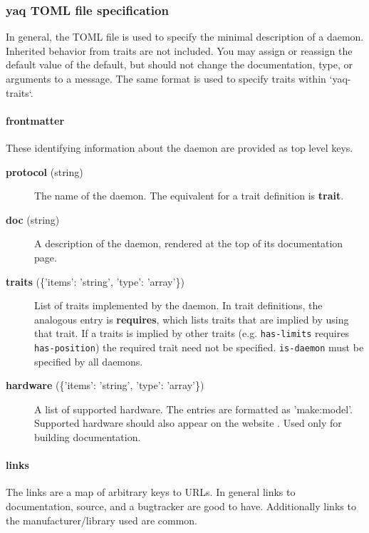 \hypertarget{yaq-toml-file-specification}{%
\subsubsection{yaq TOML file
specification}\label{yaq-toml-file-specification}}

In general, the TOML file is used to specify the minimal description of
a daemon. Inherited behavior from traits are not included. You may
assign or reassign the default value of the default, but should not
change the documentation, type, or arguments to a message. The same
format is used to specify traits within `yaq-traits`.

\hypertarget{frontmatter}{%
\paragraph{frontmatter}\label{frontmatter}}

These identifying information about the daemon are provided as top level
keys.

\begin{description}
\item[\textbf{protocol} (string)]
The name of the daemon. The equivalent for a trait definition is
\textbf{trait}.
\item[\textbf{doc} (string)]
A description of the daemon, rendered at the top of its documentation
page.
\item[\textbf{traits} (\{'items': 'string', 'type': 'array'\})]
List of traits implemented by the daemon. In trait definitions, the
analogous entry is \textbf{requires}, which lists traits that are
implied by using that trait. If a traits is implied by other traits
(e.g. \texttt{has-limits} requires \texttt{has-position}) the required
trait need not be specified. \texttt{is-daemon} must be specified by all
daemons.
\item[\textbf{hardware} (\{'items': 'string', 'type': 'array'\})]
A list of supported hardware. The entries are formatted as 'make:model'. Supported
hardware should also appear on the \yaq{} website \cite{yaq-known-hardware}.
Used only for building documentation.
\end{description}

\hypertarget{links}{%
\paragraph{links}\label{links}}

The links are a map of arbitrary keys to URLs. In general links to
documentation, source, and a bugtracker are good to have. Additionally
links to the manufacturer/library used are common.

